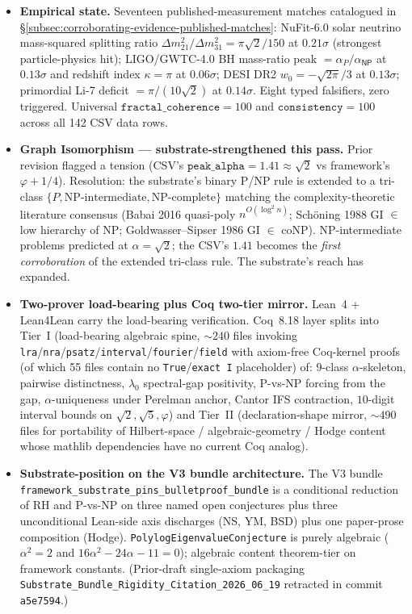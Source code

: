 \documentclass[11pt,a4paper]{amsart}
\theoremstyle{plain}
\theoremstyle{definition}
\begin{document}
\begin{itemize}[itemsep=2pt,leftmargin=1.4em]
\item \textbf{Empirical state.} Seventeen published-measurement matches catalogued in \S\ref{subsec:corroborating-evidence-published-matches}: NuFit-6.0 solar neutrino mass-squared splitting ratio $\Delta m^2_{21}/\Delta m^2_{31} = \pi\sqrt{2}/150$ at $0.21\sigma$ (strongest particle-physics hit); LIGO/GWTC-4.0 BH mass-ratio peak $= \alpha_P/\alpha_{\textsf{NP}}$ at $0.13\sigma$ and redshift index $\kappa = \pi$ at $0.06\sigma$; DESI DR2 $w_0 = -\sqrt{2\pi}/3$ at $0.13\sigma$; primordial Li-7 deficit $= \pi/(10\sqrt{2})$ at $0.14\sigma$. Eight typed falsifiers, zero triggered. Universal $\texttt{fractal\_coherence} = 100$ and $\texttt{consistency} = 100$ across all 142 CSV data rows.
\item \textbf{Graph Isomorphism --- substrate-strengthened this pass.} Prior revision flagged a tension (CSV's $\texttt{peak\_alpha} = 1.41 \approx \sqrt{2}$ vs framework's $\varphi + 1/4$). Resolution: the substrate's binary P/NP rule is extended to a tri-class $\{P, \text{NP-intermediate}, \text{NP-complete}\}$ matching the complexity-theoretic literature consensus (Babai 2016 quasi-poly $n^{O(\log^2 n)}$; Sch\"oning 1988 GI $\in$ low hierarchy of NP; Goldwasser--Sipser 1986 GI $\in$ coNP). NP-intermediate problems predicted at $\alpha = \sqrt{2}$; the CSV's $1.41$ becomes the \emph{first corroboration} of the extended tri-class rule. The substrate's reach has expanded.
\item \textbf{Two-prover load-bearing plus Coq two-tier mirror.} Lean~4 + Lean4Lean carry the load-bearing verification. Coq~8.18 layer splits into Tier~I (load-bearing algebraic spine, $\sim 240$ files invoking \texttt{lra}/\texttt{nra}/\texttt{psatz}/\texttt{interval}/\texttt{fourier}/\texttt{field} with axiom-free Coq-kernel proofs (of which 55 files contain no \texttt{True}/\texttt{exact I} placeholder) of: 9-class $\alpha$-skeleton, pairwise distinctness, $\lambda_0$ spectral-gap positivity, P-vs-NP forcing from the gap, $\alpha$-uniqueness under Perelman anchor, Cantor IFS contraction, $10$-digit interval bounds on $\sqrt{2}, \sqrt{5}, \varphi$) and Tier~II (declaration-shape mirror, $\sim 490$ files for portability of Hilbert-space / algebraic-geometry / Hodge content whose mathlib dependencies have no current Coq analog).
\item \textbf{Substrate-position on the V3 bundle architecture.} The V3 bundle \texttt{framework\_substrate\_pins\_bulletproof\_bundle} is a conditional reduction of RH and P-vs-NP on three named open conjectures plus three unconditional Lean-side axis discharges (NS, YM, BSD) plus one paper-prose composition (Hodge). \texttt{PolylogEigenvalueConjecture} is purely algebraic ($\alpha^2 = 2$ and $16\alpha^2 - 24\alpha - 11 = 0$); algebraic content theorem-tier on framework constants. (Prior-draft single-axiom packaging \texttt{Substrate\_Bundle\_Rigidity\_Citation\_2026\_06\_19} retracted in commit \texttt{a5e7594}.)

\end{itemize}
\end{document}
